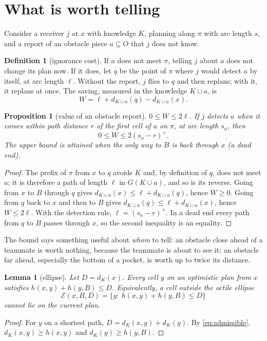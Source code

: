 \documentclass[11pt,a4paper]{article}
\newtheorem{proposition}{Proposition}
\newtheorem{lemma}{Lemma}
\theoremstyle{definition}
\newtheorem{definition}{Definition}
\newcommand{\pos}[1]{\left(#1\right)^{+}}
\begin{document}
\section{What is worth telling}\label{sec:voi}

Consider a receiver $j$ at $x$ with knowledge $K$, planning along $\pi$ with arc length $s$, and a report of an obstacle piece $a\subseteq O$ that $j$ does not know.

\begin{definition}[ignorance cost]
If $a$ does not meet $\pi$, telling $j$ about $a$ does not change its plan now. If it does, let $q$ be the point of $\pi$ where $j$ would detect $a$ by itself, at arc length $\ell$. Without the report, $j$ flies to $q$ and then replans; with it, it replans at once. The saving, measured in the knowledge $K\cup a$, is
\[
W=\ell+d_{K\cup a}(q)-d_{K\cup a}(x).
\]
\end{definition}

\begin{proposition}[value of an obstacle report]\label{prop:voi}
$0\le W\le 2\ell$. If $j$ detects $a$ when it comes within path distance $r$ of the first cell of $a$ on $\pi$, at arc length $s_a$, then
\[
0\le W\le 2\pos{s_a-r}.
\]
The upper bound is attained when the only way to $B$ is back through $x$ (a dead end).
\end{proposition}
\begin{proof}
The prefix of $\pi$ from $x$ to $q$ avoids $K$ and, by definition of $q$, does not meet $a$; it is therefore a path of length $\ell$ in $G(K\cup a)$, and so is its reverse. Going from $x$ to $B$ through $q$ gives $d_{K\cup a}(x)\le\ell+d_{K\cup a}(q)$, hence $W\ge0$. Going from $q$ back to $x$ and then to $B$ gives $d_{K\cup a}(q)\le\ell+d_{K\cup a}(x)$, hence $W\le2\ell$. With the detection rule, $\ell=\pos{s_a-r}$. In a dead end every path from $q$ to $B$ passes through $x$, so the second inequality is an equality.
\end{proof}

The bound says something useful about \emph{whom} to tell: an obstacle close ahead of a teammate is worth nothing, because the teammate is about to see it; an obstacle far ahead, especially the bottom of a pocket, is worth up to twice its distance.

\begin{lemma}[ellipse]\label{lem:ellipse}
Let $D=d_K(x)$. Every cell $y$ on an optimistic plan from $x$ satisfies $h(x,y)+h(y,B)\le D$. Equivalently, a cell outside the octile ellipse
\[
\mathcal E(x,B,D)=\{y:\ h(x,y)+h(y,B)\le D\}
\]
cannot lie on the current plan.
\end{lemma}
\begin{proof}
For $y$ on a shortest path, $D=d_K(x,y)+d_K(y)$. By \eqref{eq:admissible}, $d_K(x,y)\ge h(x,y)$ and $d_K(y)\ge h(y,B)$.
\end{proof}
\end{document}
